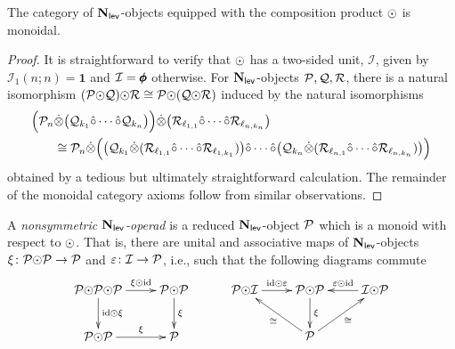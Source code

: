 \begin{proposition} \label{N_l-monoidal}
The category of $\mathbf{N}_{\mathsf{lev}}$-objects equipped with the composition product ${\odot}$ is monoidal.
\end{proposition}

\begin{proof}
It is straightforward to verify that ${\odot}$ has a two-sided unit, $\mathcal{I}$, given by $\mathcal{I}_1(n;n)=\mathbf{1}$ and $\mathcal{I}=\pmb{\phi}$ otherwise. For $\mathbf{N}_{\mathsf{lev}}$-objects $\mathcal{P},\mathcal{Q},\mathcal{R}$, there is a natural isomorphism $(\mathcal{P}{\odot} \mathcal{Q}){\odot} \mathcal{R}\cong \mathcal{P}{\odot} (\mathcal{Q}{\odot} \mathcal{R})$ induced by the natural isomorphisms \begin{align} \label{asoc-circdot}
\Big( \mathcal{P}_n &\dot{\otimes} \big(\mathcal{Q}_{k_1}\hat{\circ} \cdots \hat{\circ} \mathcal{Q}_{k_n}\big)\Big)\dot{\otimes} \big(\mathcal{R}_{\ell_{1,1}}\hat{\circ} \cdots \hat{\circ} \mathcal{R}_{\ell_{n,k_n}}\big) 
\\
&\cong \mathcal{P}_n \dot{\otimes} \Big( \big(\mathcal{Q}_{k_1} \dot{\otimes} (\mathcal{R}_{\ell_{1,1}}\hat{\circ} \cdots \hat{\circ} \mathcal{R}_{\ell_{1,k_1}}) \big) \hat{\circ} \cdots \hat{\circ} \big(\mathcal{Q}_{k_n} \dot{\otimes} (\mathcal{R}_{\ell_{n,1}}\hat{\circ} \cdots \hat{\circ} \mathcal{R}_{\ell_{n,k_n}}) \big)\Big) \nonumber
\end{align}
obtained by a tedious but ultimately straightforward calculation. The remainder of the monoidal category axioms follow from similar observations. 
\end{proof}

\begin{definition} 
A \textit{nonsymmetric $\mathbf{N}_{\mathsf{lev}}$-operad} is a reduced $\mathbf{N}_{\mathsf{lev}}$-object $\mathcal{P}$ which is a monoid with respect to ${\odot}$. That is, there are unital and associative maps of $\mathbf{N}_{\mathsf{lev}}$-objects $\xi\colon \mathcal{P}{\odot} \mathcal{P}\to\mathcal{P}$ and $\varepsilon\colon \mathcal{I}\to \mathcal{P}$, i.e., such that the following diagrams commute \[ \xymatrix{ \Cal{P}\circdot \Cal{P} \circdot \Cal{P} \ar[r]^-{\xi\circdot\id} \ar[d]^-{\id\circdot \xi}& \Cal{P}\circdot \Cal{P} \ar[d]^-{\xi} \\ \Cal{P}\circdot \Cal{P} \ar[r]^-{\xi} & \Cal{P}} \hspace{1cm} \xymatrix{ \Cal{P} \circdot \Cal{I} \ar[r]^-{\id\circdot \varepsilon} & \Cal{P}\circdot \Cal{P} \ar[d]^-{\xi} & \Cal{I} \circdot \Cal{P} \ar[l]_-{\varepsilon \circdot \id} \\ & \Cal{P} \ar[ul]^-{\cong} \ar[ur]_{\cong} }\]
\end{definition}

